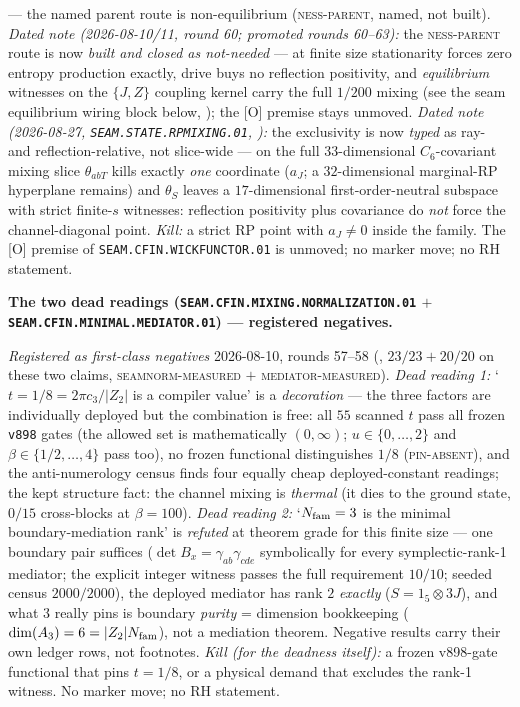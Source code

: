 \documentclass[11pt,a4paper]{article}
\begin{document}
{--- the named parent route is non-equilibrium
(\textsc{ness-parent}, named, not built).  \emph{Dated note
(2026-08-10/11, round 60; promoted rounds 60--63):} the
\textsc{ness-parent} route is now \emph{built and closed as
not-needed} --- at finite size stationarity forces zero entropy
production exactly, drive buys no reflection positivity, and
\emph{equilibrium} witnesses on the $\{J, Z\}$ coupling kernel
carry the full $1/200$ mixing (see the seam equilibrium wiring
block below, ); the [O]
premise stays unmoved.  \emph{Dated note (2026-08-27,
\texttt{SEAM.STATE.RPMIXING.01},
):} the exclusivity is
now \emph{typed} as ray- and reflection-relative, not
slice-wide --- on the full $33$-dimensional $C_6$-covariant
mixing slice $\theta_{abT}$ kills exactly \emph{one} coordinate
($a_J$; a $32$-dimensional marginal-RP hyperplane remains) and
$\theta_S$ leaves a $17$-dimensional first-order-neutral
subspace with strict finite-$s$ witnesses: reflection
positivity plus covariance do \emph{not} force the
channel-diagonal point.  \emph{Kill:} a strict
RP point with $a_J \ne 0$ inside the family.  The [O] premise of
\texttt{SEAM.CFIN.WICKFUNCTOR.01} is unmoved; no marker move; no
RH statement.\par}

\par\smallskip\noindent\textbf{The two dead readings
(\texttt{SEAM.CFIN.MIXING.\allowbreak NORMALIZATION.01} $+$
\texttt{SEAM.CFIN.MINIMAL.\allowbreak MEDIATOR.01}) ---
registered negatives.}
{\sloppy
\emph{Registered as first-class negatives} 2026-08-10, rounds
57--58 (, $23/23 + 20/20$ on
these two claims, \textsc{seamnorm-measured} $+$
\textsc{mediator-measured}).  \emph{Dead reading 1:} `$t = 1/8 =
2\pi c_3/|Z_2|$ is a compiler value' is a \emph{decoration} ---
the three factors are individually deployed but the combination
is free: all $55$ scanned $t$ pass all frozen \texttt{v898} gates
(the allowed set is mathematically $(0, \infty)$; $u \in \{0,
\ldots, 2\}$ and $\beta \in \{1/2, \ldots, 4\}$ pass too), no
frozen functional distinguishes $1/8$ (\textsc{pin-absent}), and
the anti-numerology census finds four equally cheap
deployed-constant readings; the kept structure fact: the channel
mixing is \emph{thermal} (it dies to the ground state, $0/15$
cross-blocks at $\beta = 100$).  \emph{Dead reading 2:}
`$N_{\rm fam} = 3$ is the minimal boundary-mediation rank' is
\emph{refuted} at theorem grade for this finite size --- one
boundary pair suffices ($\det B_x = \gamma_{ab}\gamma_{cde}$
symbolically for every symplectic-rank-1 mediator; the explicit
integer witness passes the full requirement $10/10$; seeded
census $2000/2000$), the deployed mediator has rank $2$
\emph{exactly} ($S = 1_5 \otimes 3J$), and what $3$ really pins
is boundary \emph{purity} = dimension bookkeeping
($\dim(A_3) = 6 = |Z_2| N_{\rm fam}$), not a mediation theorem.
Negative results carry their own ledger rows, not footnotes.
\emph{Kill (for the deadness itself):} a frozen v898-gate
functional that pins $t = 1/8$, or a physical demand that
excludes the rank-1 witness.  No marker move; no RH
statement.\par}
\end{document}
